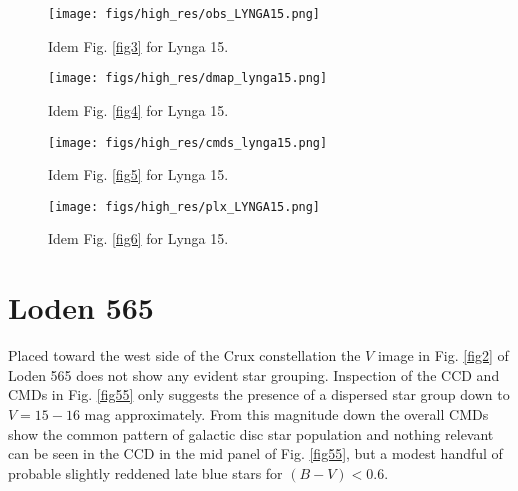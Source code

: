 \documentclass{aa}
\begin{document}
\begin{figure*}[ht]
    \centering
    \texttt{[image: figs/high\_res/obs\_LYNGA15.png]}
    \caption{Idem Fig. \ref{fig3} for Lynga 15.}
    \label{fig51}
\end{figure*}
\begin{figure*}[ht]
    \centering
    \texttt{[image: figs/high\_res/dmap\_lynga15.png]}
    \caption{Idem Fig. \ref{fig4} for Lynga 15.}
    \label{fig52}
\end{figure*}
\begin{figure*}[ht]
    \centering
    \texttt{[image: figs/high\_res/cmds\_lynga15.png]}
    \caption{Idem Fig. \ref{fig5} for Lynga 15.}
    \label{fig53}
\end{figure*}
\begin{figure*}[ht]
    \centering
    \texttt{[image: figs/high\_res/plx\_LYNGA15.png]}
    \caption{Idem Fig. \ref{fig6} for Lynga 15.}
    \label{fig54}
\end{figure*}



\section{Loden 565}

Placed toward the west side of the Crux constellation the $V$ image in Fig. 
\ref{fig2} of Loden 565 does not show any evident star grouping. Inspection of
the CCD and CMDs in Fig. \ref{fig55} only suggests the presence of a dispersed
star group down to $V= 15-16$ mag approximately. From this magnitude down the
overall CMDs show the common pattern of galactic disc star population and
nothing relevant can be seen in the CCD in the mid panel of Fig. \ref{fig55}, but
a modest handful of probable slightly reddened late blue stars for
$(B-V)<0.6$.\\
\end{document}
